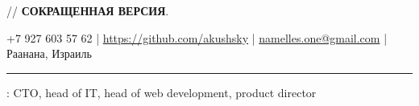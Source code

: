\documentclass[11pt]{article}
\newif\ifdetailed
\begin{document}
%
\ifdetailed
{\small{// {\textbf{ПОЛНАЯ ВЕРСИЯ}}. }}
\else
{\small{// {\textbf{СОКРАЩЕННАЯ ВЕРСИЯ}}. }}
\fi

\vspace{0.5em}

\noindent +7 927 603 57 62    |    \url{https://github.com/akushsky}   |   \href{mailto:namelles.one@gmail.com}{namelles.one@gmail.com}  |  Раанана, Израиль  \ifdetailed | 27 мая 1988 \fi

\vspace{0.5em}

\hrule

\vspace{1.5em}

\ifdetailed
\noindent {\textbf{ЦЕЛЬ}}: Работа в крупной стабильной IT-компании в роли технического директора, руководителя разработки ПО, тех-нологического евангелиста, в роли технической поддержки продаж, руководителя подразделения, менеджера крупногоIT-проекта.
\else
{}: CTO, head of IT, head of web development, product director
\fi

\vspace{1em}
\end{document}

